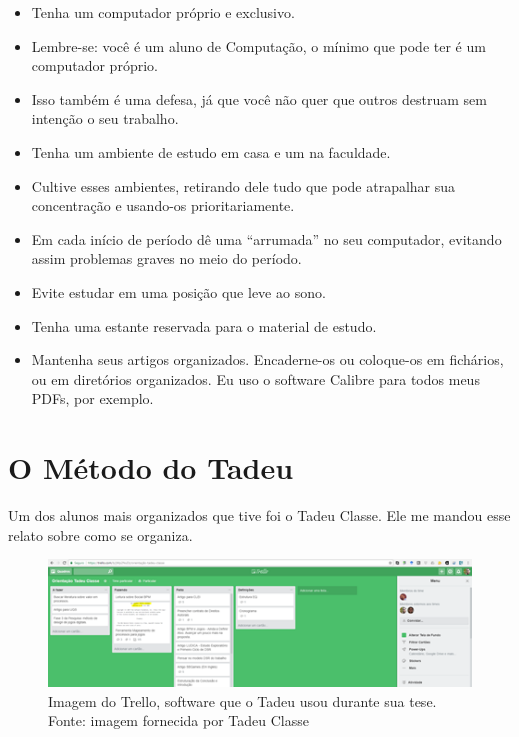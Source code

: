 \begin{itemize}
\item	Tenha um computador próprio e exclusivo. 


\item	Lembre-se: você é um aluno de Computação, o mínimo que pode ter é um computador próprio.


\item	Isso também é uma defesa, já que você não quer que outros destruam sem intenção o seu trabalho.


\item	Tenha um ambiente de estudo em casa e um na faculdade. 


\item	Cultive esses ambientes, retirando dele tudo que pode atrapalhar sua concentração e usando-os prioritariamente. 


\item	Em cada início de período dê uma “arrumada” no seu computador, evitando assim problemas graves no meio do período. 


\item	Evite estudar em uma posição que leve ao sono. 


\item	Tenha uma estante reservada para o material de estudo. 


\item	Mantenha seus artigos organizados. Encaderne-os ou coloque-os em fichários, ou em diretórios organizados. Eu uso o software Calibre para todos meus PDFs, por exemplo.
\end{itemize}

\section{O Método do Tadeu}


Um dos alunos mais organizados que tive foi o Tadeu Classe. Ele me mandou esse relato sobre como se organiza.



\begin{figure}[hbt]
	\centering
	\includegraphics[width=0.7\linewidth]{Images/Trello}
	\caption{Imagem do Trello, software que o Tadeu usou durante sua tese. Fonte: imagem fornecida por Tadeu Classe}
	\label{fig:trello}
\end{figure}



